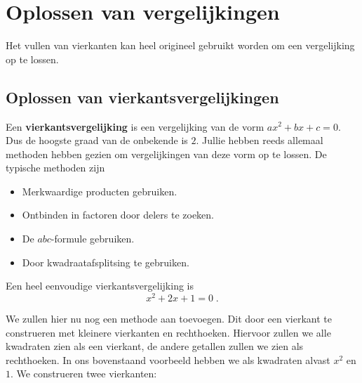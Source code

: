 
\section{Oplossen van vergelijkingen}

Het vullen van vierkanten kan heel origineel gebruikt worden om een vergelijking op te lossen. 

\subsection{Oplossen van vierkantsvergelijkingen}

Een {\bf vierkantsvergelijking} is een vergelijking van de vorm $ax^2 + bx + c = 0$. Dus de hoogste graad van de onbekende is $2$. Jullie hebben reeds allemaal methoden hebben gezien om vergelijkingen van deze vorm op te lossen. De typische methoden zijn
\begin{itemize}
  \item Merkwaardige producten gebruiken.
  \item Ontbinden in factoren door delers te zoeken.
  \item De $abc$-formule gebruiken.
  \item Door kwadraatafsplitsing te gebruiken.
\end{itemize}


\answer[1cm]{}

Een heel eenvoudige vierkantsvergelijking is
$$
x^2+2x+1=0\;.
$$



We zullen hier nu nog een methode aan toevoegen. Dit door een vierkant te construeren met kleinere vierkanten en rechthoeken. Hiervoor zullen we alle kwadraten zien als een vierkant, de andere getallen zullen we zien als rechthoeken. In ons bovenstaand voorbeeld hebben we als kwadraten alvast $x^2$ en $1$. We construeren twee vierkanten:

\begin{center}

\end{center}


